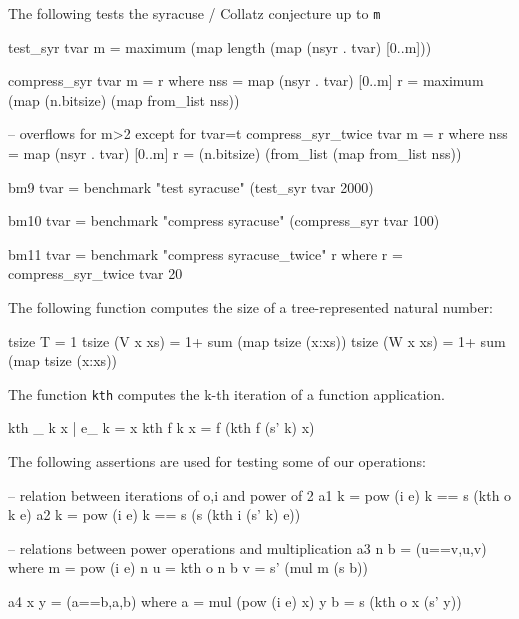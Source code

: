 \documentclass{TOOLS/llncs}
\begin{document}
The following tests the syracuse / Collatz conjecture up to {\tt m}
\begin{code}
test_syr tvar m = maximum (map length (map (nsyr . tvar) [0..m]))

compress_syr tvar m = r where
  nss = map (nsyr . tvar) [0..m]
  r = maximum (map (n.bitsize) (map from_list nss))

-- overflows for m>2 except for tvar=t
compress_syr_twice tvar m = r  where
  nss = map (nsyr . tvar) [0..m]
  r = (n.bitsize) (from_list (map from_list nss))
  
bm9 tvar = benchmark "test syracuse" (test_syr tvar 2000)

bm10 tvar = benchmark "compress syracuse" (compress_syr tvar 100)

bm11 tvar = benchmark "compress syracuse_twice" r where
            r = compress_syr_twice tvar 20
\end{code}

The following function computes the size of a tree-represented
natural number:
\begin{code}
tsize T = 1
tsize (V x xs) = 1+ sum (map tsize (x:xs))
tsize (W x xs) = 1+ sum (map tsize (x:xs))
\end{code}

The function {\tt kth} computes the k-th iteration of a function
application.
\begin{code}
kth _ k x | e_ k  = x
kth f k x  = f (kth f (s' k) x)
\end{code}

The following assertions are used for testing some of our operations:

\begin{code}
-- relation between iterations of o,i and power of 2 
a1 k = pow (i e) k == s (kth o k e) 
a2 k = pow (i e) k == s (s (kth i (s'  k) e))

-- relations between power operations and multiplication
a3 n b = (u==v,u,v) where
 m = pow (i e) n
 u = kth o n b
 v = s' (mul m (s b))
 
a4 x y = (a==b,a,b) where 
  a = mul (pow (i e) x) y
  b = s (kth o x (s' y))
\end{code}
\end{document}
